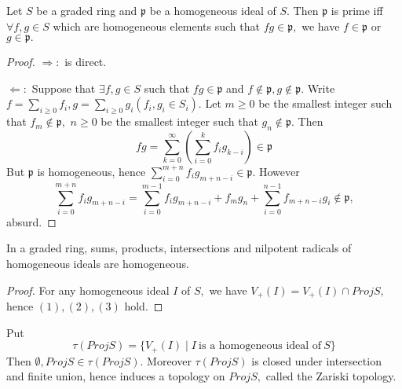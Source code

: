 \begin{prop}
Let $S$ be a graded ring and $\mathfrak{p}$ be a homogeneous ideal
of $S.$ Then $\mathfrak{p}$ is prime iff $\forall f,g\in S$ which
are homogeneous elements such that $fg\in\mathfrak{p},$ we have
$f\in\mathfrak{p}$ or $g\in\mathfrak{p}.$
\end{prop}
\begin{proof}
$\Longrightarrow:$ is direct.

$\Longleftarrow:$ Suppose that $\exists f,g\in S$ such that
$fg\in\mathfrak{p}$ and $f\not\in\mathfrak{p},
g\not\in\mathfrak{p}.$ Write $f=\sum\limits_{i\geqslant 0}f_i,
g=\sum\limits_{i\geqslant 0}g_i(f_i, g_i\in S_i).$ Let $m\geqslant
0$ be the smallest integer such that $f_m\not\in\mathfrak{p},$
$n\geqslant 0$ be the smallest integer such that
$g_n\not\in\mathfrak{p}.$ Then
$$fg=\sum\limits_{k=0}^{\infty}(\sum\limits_{i=0}^kf_ig_{k-i})\in\mathfrak{p}$$
But $\mathfrak{p}$ is homogeneous, hence
$\sum\limits_{i=0}^{m+n}f_ig_{m+n-i}\in\mathfrak{p}.$ However
$$\sum\limits_{i=0}^{m+n}f_ig_{m+n-i}=\sum\limits_{i=0}^{m-1}f_ig_{m+n-i}
+f_mg_n+\sum\limits_{i=0}^{n-1}f_{m+n-i}g_i\not\in\mathfrak{p},$$
absurd.
\end{proof}
\begin{remark}
In a graded ring, sums, products, intersections and nilpotent
radicals of homogeneous ideals are homogeneous.
\end{remark}
\begin{proof}
For any homogeneous ideal $I$ of $S,$ we have $V_+(I)=V_+(I)\cap
ProjS,$ hence $(1),(2),(3)$ hold.
\end{proof}
\begin{remark}
Put $$\tau(ProjS)=\{V_+(I)\mid I \ \text{is a homogeneous ideal of}\
S\}$$ Then $\emptyset, ProjS\in \tau(ProjS).$ Moreover $\tau(ProjS)$
is closed under intersection and finite union, hence induces a
topology on $ProjS,$ called the Zariski topology.
\end{remark}
